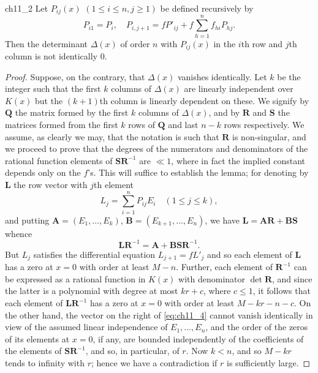 \begin{mylemma}{}{ch11_2}
Let $P_{ij}(x)$ $(1 \le i \le n, j \ge 1)$ be defined recursively by
\[P_{i1} = P_i, \quad P_{i,j+1} = f P'_{ij} + f \sum_{h=1}^{n} f_{hi} P_{hj}.\]
Then the determinant $\Delta(x)$ of order $n$ with $P_{ij}(x)$ in the $i$th row and $j$th column is not identically 0.
\end{mylemma}

\begin{proof}
Suppose, on the contrary, that $\Delta(x)$ vanishes identically. Let $k$ be the integer such that the first $k$ columns of $\Delta(x)$ are linearly independent over $K(x)$ but the $(k+1)$th column is linearly dependent on these. We signify by $\mathbf{Q}$ the matrix formed by the first $k$ columns of $\Delta(x)$, and by $\mathbf{R}$ and $\mathbf{S}$ the matrices formed from the first $k$ rows of $\mathbf{Q}$ and last $n-k$ rows respectively. We assume, as clearly we may, that the notation is such that $\mathbf{R}$ is non-singular, and we proceed to prove that the degrees of the numerators and denominators of the rational function elements of $\mathbf{S}\mathbf{R}^{-1}$ are $\ll 1$, where in fact the implied constant depends only on the $f$'s. This will suffice to establish the lemma; for denoting by $\mathbf{L}$ the row vector with $j$th element
\[L_{j} = \sum_{i=1}^{n} P_{ij} E_{i} \quad (1 \leq j \leq k),\]
and putting $\mathbf{A} = (E_1, \dots, E_k)$, $\mathbf{B} = (E_{k+1}, \dots, E_n)$, we have $\mathbf{L} = \mathbf{A}\mathbf{R} + \mathbf{B}\mathbf{S}$ whence
\[\mathbf{L}\mathbf{R}^{-1} = \mathbf{A} + \mathbf{B}\mathbf{S}\mathbf{R}^{-1}. \tag{4}\label{eq:ch11_4}\]
But $L_j$ satisfies the differential equation $L_{j+1} = f L'_j$ and so each element of $\mathbf{L}$ has a zero at $x=0$ with order at least $M-n$. Further, each element of $\mathbf{R}^{-1}$ can be expressed as a rational function in $K(x)$ with denominator $\det\mathbf{R}$, and since the latter is a polynomial with degree at most $kr+c$, where $c \leqslant 1$, it follows that each element of $\mathbf{L}\mathbf{R}^{-1}$ has a zero at $x=0$ with order at least $M-kr-n-c$. On the other hand, the vector on the right of \eqref{eq:ch11_4} cannot vanish identically in view of the assumed linear independence of $E_1, \ldots, E_n$, and the order of the zeros of its elements at $x=0$, if any, are bounded independently of the coefficients of the elements of $\mathbf{S}\mathbf{R}^{-1}$, and so, in particular, of $r$. Now $k < n$, and so $M-kr$ tends to infinity with $r$; hence we have a contradiction if $r$ is sufficiently large.


\end{proof}
